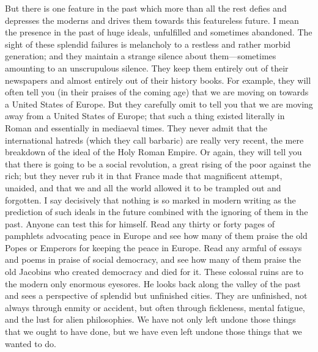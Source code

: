 \documentclass{book}
\begin{document}
But there is one feature in the past which more than all the rest defies and depresses the moderns and drives them towards this featureless future. I mean the presence in the past of huge ideals, unfulfilled and sometimes abandoned. The sight of these splendid failures is melancholy to a restless and rather morbid generation; and they maintain a strange silence about them—sometimes amounting to an unscrupulous silence. They keep them entirely out of their newspapers and almost entirely out of their history books. For example, they will often tell you (in their praises of the coming age) that we are moving on towards a United States of Europe. But they carefully omit to tell you that we are moving away from a United States of Europe; that such a thing existed literally in Roman and essentially in mediaeval times. They never admit that the international hatreds (which they call barbaric) are really very recent, the mere breakdown of the ideal of the Holy Roman Empire. Or again, they will tell you that there is going to be a social revolution, a great rising of the poor against the rich; but they never rub it in that France made that magnificent attempt, unaided, and that we and all the world allowed it to be trampled out and forgotten. I say decisively that nothing is so marked in modern writing as the prediction of such ideals in the future combined with the ignoring of them in the past. Anyone can test this for himself. Read any thirty or forty pages of pamphlets advocating peace in Europe and see how many of them praise the old Popes or Emperors for keeping the peace in Europe. Read any armful of essays and poems in praise of social democracy, and see how many of them praise the old Jacobins who created democracy and died for it. These colossal ruins are to the modern only enormous eyesores. He looks back along the valley of the past and sees a perspective of splendid but unfinished cities. They are unfinished, not always through enmity or accident, but often through fickleness, mental fatigue, and the lust for alien philosophies. We have not only left undone those things that we ought to have done, but we have even left undone those things that we wanted to do.
\end{document}
